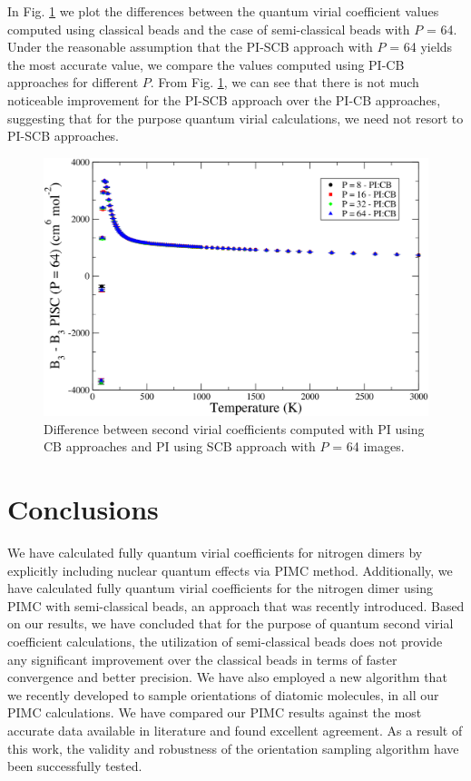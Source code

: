         In Fig. \ref{fig:B3AllDiffPICB} we plot the differences between the quantum virial coefficient values computed using classical beads and the case of semi-classical beads with $P$ = 64. Under the reasonable assumption that the PI-SCB approach with $P$ = 64 yields the most accurate value, we compare the values computed using PI-CB approaches for different $P$. From Fig. \ref{fig:B3AllDiffPICB}, we can see that there is not much noticeable improvement for the PI-SCB approach over the PI-CB approaches, suggesting that for the purpose quantum virial calculations, we need not resort to PI-SCB approaches.
        \begin{figure}[!htbp]
            \centering
            \includegraphics[scale=0.20,keepaspectratio]{Chapter-5/Figures/B3AllDiffPICB.png}
            \caption{Difference between second virial coefficients computed with PI using CB approaches and PI using SCB approach with $P$ = 64 images.}
            \label{fig:B3AllDiffPICB}
        \end{figure}

    \section{Conclusions}
    \label{sec:conclusion}
        We have calculated fully quantum virial coefficients for nitrogen dimers by explicitly including nuclear quantum effects via PIMC method. Additionally, we have calculated fully quantum virial coefficients for the nitrogen dimer using PIMC with semi-classical beads, an approach that was recently \cite{Fomms2016} introduced. Based on our results, we have concluded that for the purpose of quantum second virial coefficient calculations, the utilization of semi-classical beads does not provide any significant improvement over the classical beads in terms of faster convergence and better precision. We have also employed a new algorithm that we recently \cite{hydrogen} developed to sample orientations of diatomic molecules, in all our PIMC calculations. We have compared our PIMC results against the most accurate data available in literature and found excellent agreement. As a result of this work, the validity and robustness of the orientation sampling algorithm have been successfully tested.

